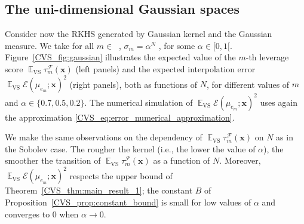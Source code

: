 \documentclass[twoside,11pt]{book}
\numberwithin{theorem}{chapter}
\numberwithin{definition}{chapter}
\numberwithin{proposition}{chapter}
\numberwithin{corollary}{chapter}
\numberwithin{example}{chapter}
\numberwithin{lemma}{chapter}
\numberwithin{assumption}{chapter}
\DeclareMathOperator{\VS}{\mathrm{VS}}
\DeclareMathOperator{\EX}{\mathbb{E}}
\DeclareMathOperator{\F}{\mathcal{F}}
\DeclareMathOperator{\Ns}{\mathbb{N}^{*}}
\begin{document}

\subsection{The uni-dimensional Gaussian spaces}

Consider now the RKHS generated by Gaussian kernel and the Gaussian measure. We take for all $m \in \Ns$, $\sigma_{m}=\alpha^{N}$  \citep{ZhWiRoMo97}, for some $\alpha \in [0,1[$.
Figure~\ref{CVS_fig:gaussian} illustrates the expected value of the $m$-th leverage score $\EX_{\VS} \tau_{m}^{\F}(\bm{x})$ (left panels) and the expected interpolation error $\EX_{\VS} \mathcal{E}(\mu_{e_{m}};\bm{x})^{2}$ (right panels), both as functions of $N$, for different values of $m$ and $\alpha \in \{0.7,0.5,0.2\}$. The numerical simulation of 
$\EX_{\VS} \mathcal{E}(\mu_{e_{m}};\bm{x})^{2}$ uses again the approximation \eqref{CVS_eq:error_numerical_approximation}.

We make the same observations on the dependency of $\EX_{\VS} \tau_{m}^{\F}(\bm{x})$ on $N$ as in the Sobolev case. The rougher the kernel (i.e., the lower the value of $\alpha$), the smoother the transition of $\EX_{\VS} \tau_{m}^{\F}(\bm{x})$ as a function of $N$. Moreover, $\EX_{\VS} \mathcal{E}(\mu_{e_{m}};\bm{x})^{2}$ respects the upper bound of Theorem~\ref{CVS_thm:main_result_1};
the constant $B$ of Proposition~\ref{CVS_prop:constant_bound} is small for low values of $\alpha$ and converges to $0$ when $\alpha \rightarrow 0$.
\end{document}

